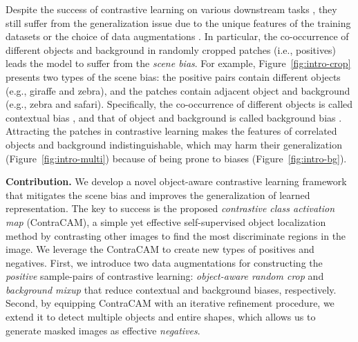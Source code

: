 \documentclass{article}
\begin{document}
Despite the success of contrastive learning on various downstream tasks \citep{zhao2021makes}, they still suffer from the generalization issue due to the unique features of the training datasets \citep{hermann2020origins,geirhos2020surprising,purushwalkam2020demystifying} or the choice of data augmentations \citep{purushwalkam2020demystifying,tian2020makes,xiao2021should}. In particular, the co-occurrence of different objects and background in randomly cropped patches (i.e., positives) leads the model to suffer from the \textit{scene bias}. For example, Figure~\ref{fig:intro-crop} presents two types of the scene bias: the positive pairs contain different objects (e.g., giraffe and zebra), and the patches contain adjacent object and background (e.g., zebra and safari). Specifically, the co-occurrence of different objects is called contextual bias \citep{singh2020don}, and that of object and background is called background bias \citep{xiao2021noise}. Attracting the patches in contrastive learning makes the features of correlated objects and background indistinguishable, which may harm their generalization (Figure~\ref{fig:intro-multi}) because of being prone to biases (Figure~\ref{fig:intro-bg}).



\textbf{Contribution.}
We develop a novel object-aware contrastive learning framework that mitigates the scene bias and improves the generalization of learned representation. The key to success is the proposed \textit{contrastive class activation map} (ContraCAM), a simple yet effective self-supervised object localization method by contrasting other images to find the most discriminate regions in the image. We leverage the ContraCAM to create new types of positives and negatives. First, we introduce two data augmentations  for constructing the \textit{positive} sample-pairs of contrastive learning: \textit{object-aware random crop} and \textit{background mixup} that reduce contextual and background biases, respectively. Second, by equipping ContraCAM with an iterative refinement procedure, we extend it to detect multiple objects and entire shapes, which allows us to generate masked images as effective \emph{negatives}.
\end{document}
